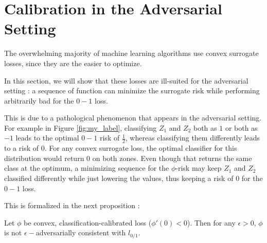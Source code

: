 \section{Calibration in the Adversarial Setting}

The overwhelming majority of machine learning algorithms use convex surrogate losses, since they are the easier to optimize. 

In this section, we will show that these losses are ill-suited for the adversarial setting : a sequence of function can minimize the surrogate risk while performing arbitrarily bad for the $0-1$ loss.

This is due to a pathological phenomenon that appears in the adversarial setting. For example in Figure \ref{fig:my_label}, classifying $Z_1$ and $Z_2$ both as $1$ or both as $-1$ leads to the optimal $0-1$ risk of $\frac{1}{2}$, whereas classifying them differently leads to a risk of $0$. For any convex surrogate loss, the optimal classifier for this distribution would return $0$ on both zones. Even though that returns the same class at the optimum, a minimizing sequence for the $\phi$-risk may keep $Z_1$ and $Z_2$ classified differently while just lowering the values, thus keeping a risk of $0$ for the $0-1$ loss.

This is formalized in the next proposition :

\begin{prop}
Let $\phi$ be convex, classification-calibrated loss ($\phi'(0) <0$). Then for any $\epsilon > 0$, $\phi$ is not $\epsilon -$adversarially consistent with $l_{0/1}$.
\end{prop}

